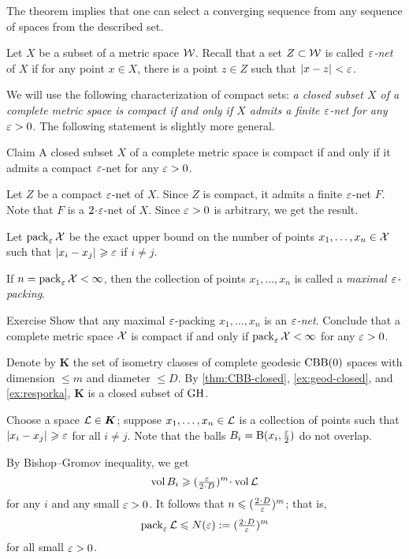 The theorem implies that one can select a converging sequence 
from any sequence of spaces from the described set.


Let $X$ be a subset of a metric space $\mathcal{W}$.
Recall that a set $Z\subset \mathcal{W}$ is called \emph{$\varepsilon$-net} of $X$ if for any point $x\in X$, there is a point $z\in Z$ such that $\dist{x}{z}{}<\eps$.

We will use the following characterization of compact sets: \textit{a closed subset $X$ of a complete metric space is compact if and only if $X$ admits a finite $\varepsilon$-net for any $\varepsilon>0$}.
The following statement is slightly more general.

\begin{thm}{Claim}\label{clm:compact-net}
A closed subset $X$ of a complete metric space is compact if and only if it admits a compact $\varepsilon$-net for any $\varepsilon>0$.
\end{thm}

Let $Z$ be a compact $\varepsilon$-net of $X$.
Since $Z$ is compact, it admits a finite $\varepsilon$-net $F$.
Note that $F$ is a $2\cdot\eps$-net of $X$.
Since $\varepsilon>0$ is arbitrary, we get the result.
\qeds

Let $\operatorname{\rm pack}\nolimits_\varepsilon\mathcal{X}$ be the exact upper bound on the number of points $x_1,\z\dots,x_n\in \spc{X}$ such that $\dist{x_i}{x_j}{}\ge\eps$ if $i\ne j$.

If $n=\operatorname{\rm pack}\nolimits_\varepsilon\mathcal{X}<\infty$, then
the collection of points $x_1,\dots,x_n$ is called a \emph{maximal $\varepsilon$-packing}.

\begin{thm}{Exercise}\label{ex:pack-net}
Show that any maximal $\varepsilon$-packing $x_1,\dots,x_n$ is an \emph{$\varepsilon$-net}.
Conclude that a complete metric space $\mathcal{X}$ is compact if and only if $\pack_\eps\spc{X}\z<\infty$ for any $\varepsilon>0$.
\end{thm}


Denote by $\bm{K}$ the set of isometry classes of  complete geodesic $\mathrm{CBB}(0)$ spaces  with dimension $\le m$ and diameter $\le D$.
By \ref{thm:CBB-closed}, \ref{ex:geod-closed}, and \ref{ex:resporka}, $\bm{K}$ is a closed subset of $\operatorname{\rm GH}\nolimits$.

Choose a space $\mathcal{L}\in \bm{K}$;
suppose $x_1,\dots,x_n\in \mathcal{L}$ is a collection of points such that $\dist{x_i}{x_j}{}\ge \eps$ for all $i\ne j$.
Note that the balls $B_i=\mathrm{B}{}(x_i,\tfrac{\varepsilon}2)$ do not overlap.

By Bishop--Gromov inequality, we get 
\[\vol B_i\ge (\tfrac\eps{2\cdot D})^m\cdot\vol \spc{L}\]
for any $i$ and any small $\varepsilon>0$.
It follows that $n\le (\tfrac{2\cdot D}\eps)^m$;
that is, 
\[\pack_\eps\spc{L}\le  N(\eps)\df(\tfrac{2\cdot D}\eps)^m\]
for all small $\varepsilon>0$.


